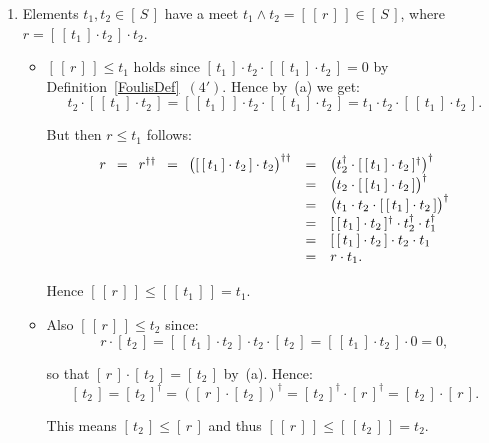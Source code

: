 \documentclass{article}
\newcommand{\conjun}{\mathrel{\wedge}}
\newcommand{\sai}[1]{[\,#1\,]}
\begin{document}
{\begin{enumerate}
\item Elements $t_{1},t_{2}\in \sai{S}$ have a meet $t_{1}\conjun t_{2} =
  \sai{\sai{r}}\in \sai{S}$, where $r = \sai{\sai{t_1}\cdot t_2}\cdot t_{2}$.
\begin{itemize}
\item $\sai{\sai{r}} \leq t_{1}$ holds since $\sai{t_{1}}\cdot t_{2} \cdot
  \sai{\sai{t_1}\cdot t_2} = 0$ by Definition~\ref{FoulisDef}~$(4')$. Hence
  by~(a) we get:
$$t_{2}\cdot \sai{\sai{t_1}\cdot t_2}
=
\sai{\sai{t_{1}}}\cdot t_{2} \cdot \sai{\sai{t_1}\cdot t_2}
=
t_{1}\cdot t_{2} \cdot \sai{\sai{t_1}\cdot t_2}.$$

\noindent But then $r\leq t_{1}$ follows:
$$\begin{array}{rcl}
r
\hspace*{\arraycolsep} = \hspace*{\arraycolsep}
r^{\dag\dag}
\hspace*{\arraycolsep} = \hspace*{\arraycolsep}
\big(\sai{\sai{t_1}\cdot t_2}\cdot t_{2}\big)^{\dag\dag} 
& = &
\big(t_{2}^{\dag} \cdot \sai{\sai{t_1}\cdot t_2}^{\dag}\big)^{\dag} \\
& = &
\big(t_{2} \cdot \sai{\sai{t_1}\cdot t_2}\big)^{\dag} \\
& = &
\big(t_{1}\cdot t_{2} \cdot \sai{\sai{t_1}\cdot t_2}\big)^{\dag} \\
& = &
\sai{\sai{t_1}\cdot t_2}^{\dag} \cdot t_{2}^{\dag} \cdot t_{1}^{\dag} \\
& = &
\sai{\sai{t_1}\cdot t_2} \cdot t_{2} \cdot t_{1} \\
& = &
r\cdot t_{1}.
\end{array}$$

\noindent Hence $\sai{\sai{r}} \leq \sai{\sai{t_{1}}} = t_{1}$.

\item Also $\sai{\sai{r}} \leq t_{2}$ since:
$$r\cdot \sai{t_{2}}
=
\sai{\sai{t_1}\cdot t_2} \cdot t_{2} \cdot \sai{t_{2}}
=
\sai{\sai{t_1}\cdot t_2} \cdot 0
=
0,$$

\noindent so that $\sai{r}\cdot \sai{t_{2}} = \sai{t_{2}}$ by~(a). Hence:
$$\sai{t_{2}}
=
\sai{t_{2}}^{\dag}
=
(\sai{r}\cdot \sai{t_{2}})^{\dag}
=
\sai{t_{2}}^{\dag}\cdot \sai{r}^{\dag}
=
\sai{t_{2}} \cdot \sai{r}.$$

\noindent This means $\sai{t_{2}} \leq \sai{r}$ and thus $\sai{\sai{r}} \leq
\sai{\sai{t_2}} = t_{2}$.


\end{itemize}
\end{enumerate}}
\end{document}
